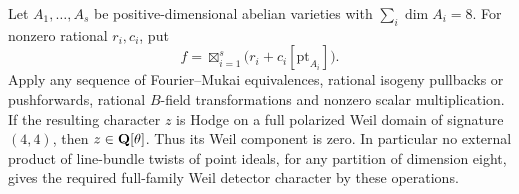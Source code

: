 \begin{theorem}\label{thm:all-point-products}
Let $A_1,\ldots,A_s$ be positive-dimensional abelian varieties with
$\sum_i\dim A_i=8$. For nonzero rational $r_i,c_i$, put
\[
 f=\boxtimes_{i=1}^s\bigl(r_i+c_i[\mathrm{pt}_{A_i}]\bigr).
\]
Apply any sequence of Fourier--Mukai equivalences, rational isogeny
pullbacks or pushforwards, rational $B$-field transformations and
nonzero scalar multiplication. If the resulting character $z$ is
Hodge on a full polarized Weil domain of signature $(4,4)$, then
$z\in\mathbf Q[\theta]$. Thus its Weil component is zero.
In particular no external product of line-bundle twists of point
ideals, for any partition of dimension eight, gives the required
full-family Weil detector character by these operations.
\end{theorem}

